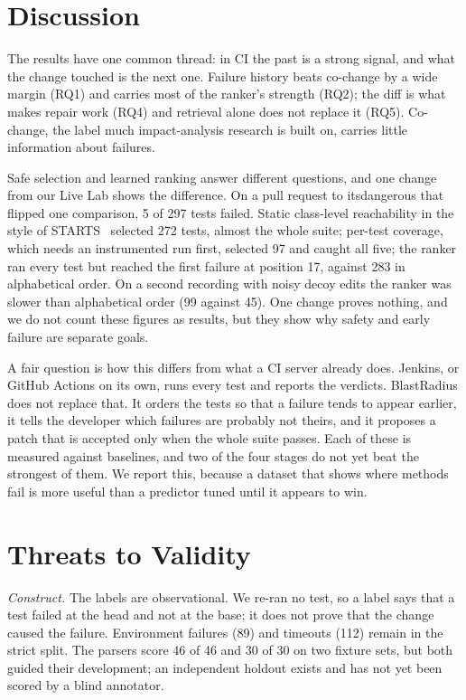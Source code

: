 \documentclass[10pt,conference]{IEEEtran}
\begin{document}
\section{Discussion}
\label{sec:discussion}

The results have one common thread: in CI the past is a strong signal, and what the change touched is the next one. Failure history beats co-change by a wide margin (RQ1) and carries most of the ranker's strength (RQ2); the diff is what makes repair work (RQ4) and retrieval alone does not replace it (RQ5). Co-change, the label much impact-analysis research is built on, carries little information about failures.

Safe selection and learned ranking answer different questions, and one change from our Live Lab shows the difference. On a pull request to itsdangerous that flipped one comparison, 5 of 297 tests failed. Static class-level reachability in the style of STARTS~\cite{legunsen2017starts} selected 272 tests, almost the whole suite; per-test coverage, which needs an instrumented run first, selected 97 and caught all five; the ranker ran every test but reached the first failure at position 17, against 283 in alphabetical order. On a second recording with noisy decoy edits the ranker was slower than alphabetical order (99 against 45). One change proves nothing, and we do not count these figures as results, but they show why safety and early failure are separate goals.

A fair question is how this differs from what a CI server already does. Jenkins, or GitHub Actions on its own, runs every test and reports the verdicts. BlastRadius does not replace that. It orders the tests so that a failure tends to appear earlier, it tells the developer which failures are probably not theirs, and it proposes a patch that is accepted only when the whole suite passes. Each of these is measured against baselines, and two of the four stages do not yet beat the strongest of them. We report this, because a dataset that shows where methods fail is more useful than a predictor tuned until it appears to win.

\section{Threats to Validity}
\label{sec:threats}

\textit{Construct.} The labels are observational. We re-ran no test, so a label says that a test failed at the head and not at the base; it does not prove that the change caused the failure. Environment failures (89) and timeouts (112) remain in the strict split. The parsers score 46 of 46 and 30 of 30 on two fixture sets, but both guided their development; an independent holdout exists and has not yet been scored by a blind annotator.
\end{document}
